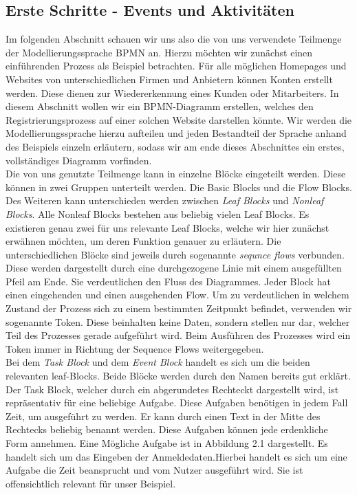 \subsection{Erste Schritte - Events und Aktivitäten}
Im folgenden Abschnitt schauen wir uns also die von uns verwendete Teilmenge der Modellierungssprache BPMN an. Hierzu möchten wir zunächst einen einführenden Prozess als Beispiel betrachten. Für alle möglichen Homepages und Websites von unterschiedlichen Firmen und Anbietern können Konten erstellt werden. Diese dienen zur Wiedererkennung eines Kunden oder Mitarbeiters. In diesem Abschnitt wollen wir ein BPMN-Diagramm erstellen, welches den Registrierungsprozess auf einer solchen Website darstellen könnte. Wir werden die Modellierungssprache hierzu aufteilen und jeden Bestandteil der Sprache anhand des Beispiels einzeln erläutern, sodass wir am ende dieses Abschnittes ein erstes, vollständiges Diagramm vorfinden.\\
Die von uns genutzte Teilmenge kann in einzelne Blöcke eingeteilt werden. Diese können in zwei Gruppen unterteilt werden. Die Basic Blocks und die Flow Blocks. Des Weiteren kann unterschieden werden zwischen \textit{Leaf Blocks} und \textit{Nonleaf Blocks}. Alle Nonleaf Blocks bestehen aus beliebig vielen Leaf Blocks. Es existieren genau zwei für uns relevante Leaf Blocks, welche wir hier zunächst erwähnen möchten, um deren Funktion genauer zu erläutern. Die unterschiedlichen Blöcke sind jeweils durch sogenannte \textit{sequnce flows} verbunden. Diese werden dargestellt durch eine durchgezogene Linie mit einem ausgefüllten Pfeil am Ende. Sie verdeutlichen den Fluss des Diagrammes. Jeder Block hat einen eingehenden und einen ausgehenden Flow. Um zu verdeutlichen in welchem Zustand der Prozess sich zu einem bestimmten Zeitpunkt befindet, verwenden wir sogenannte Token. Diese beinhalten keine Daten, sondern stellen nur dar, welcher Teil des Prozesses gerade aufgeführt wird. Beim Ausführen des Prozesses wird ein Token immer in Richtung der Sequence Flows weitergegeben.\\
Bei dem \textit{Task Block} und dem \textit{Event Block} handelt es sich um die beiden relevanten leaf-Blocks. Beide Blöcke werden durch den Namen bereits gut erklärt. Der Task Block, welcher durch ein abgerundetes Rechteckt dargestellt wird, ist repräsentativ für eine beliebige Aufgabe. Diese Aufgaben benötigen in jedem Fall Zeit, um ausgeführt zu werden. Er kann durch einen Text in der Mitte des Rechtecks beliebig benannt werden. Diese Aufgaben können jede erdenkliche Form annehmen. Eine Mögliche Aufgabe ist in Abbildung 2.1 dargestellt. Es handelt sich um das Eingeben der Anmeldedaten.Hierbei handelt es sich um eine Aufgabe die Zeit beansprucht und vom Nutzer ausgeführt wird. Sie ist offensichtlich relevant für unser Beispiel.\\
